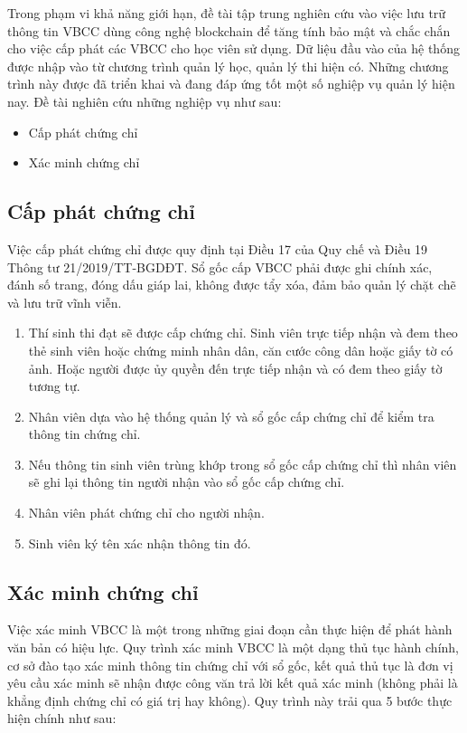 Trong phạm vi khả năng giới hạn, đề tài tập trung nghiên cứu vào việc lưu trữ thông tin VBCC dùng công nghệ blockchain để tăng tính bảo mật và chắc chắn cho việc cấp phát các VBCC cho học viên sử dụng. Dữ liệu đầu vào của hệ thống được nhập vào từ chương trình quản lý học, quản lý thi hiện có. 
Những chương trình này được đã triển khai và đang đáp ứng tốt một số nghiệp vụ quản lý hiện nay. 
Đề tài nghiên cứu những nghiệp vụ như sau:

\begin{itemize}
\item Cấp phát chứng chỉ
\item Xác minh chứng chỉ
\end{itemize}

\subsection{Cấp phát chứng chỉ}

Việc cấp phát chứng chỉ được quy định tại Điều 17 của Quy chế và Điều 19 Thông tư 21/2019/TT-BGDĐT. 
Sổ gốc cấp VBCC phải được ghi chính xác, đánh số trang, đóng dấu giáp lai, không được tẩy xóa, đảm bảo quản lý chặt chẽ và lưu trữ vĩnh viễn.

\begin{enumerate}
\item Thí sinh thi đạt sẽ được cấp chứng chỉ. Sinh viên trực tiếp nhận và đem theo thẻ sinh viên hoặc chứng minh nhân dân, căn cước công dân hoặc giấy tờ có ảnh. Hoặc người được ủy quyền đến trực tiếp nhận và có đem theo giấy tờ tương tự.
\item Nhân viên dựa vào hệ thống quản lý và sổ gốc cấp chứng chỉ để kiểm tra thông tin chứng chỉ.
\item Nếu thông tin sinh viên trùng khớp trong sổ gốc cấp chứng chỉ thì nhân viên sẽ ghi lại thông tin người nhận vào sổ gốc cấp chứng chỉ.
\item Nhân viên phát chứng chỉ cho người nhận.
\item Sinh viên ký tên xác nhận thông tin đó.
\end{enumerate}

\subsection{Xác minh chứng chỉ}

Việc xác minh VBCC là một trong những giai đoạn cần thực hiện để phát hành văn bản có hiệu lực. 
Quy trình xác minh VBCC là một dạng thủ tục hành chính, cơ sở đào tạo xác minh thông tin chứng chỉ với sổ gốc, kết quả thủ tục là đơn vị yêu cầu xác minh sẽ nhận được công văn trả lời kết quả xác minh (không phải là khẳng định chứng chỉ có giá trị hay không). 
Quy trình này trải qua 5 bước thực hiện chính như sau:

